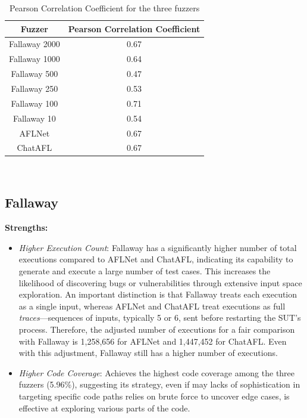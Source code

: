 \begin{table}[H]
    \centering
    \begin{tabular}{|c|c|}
    \hline
    \textbf{Fuzzer} & \textbf{Pearson Correlation Coefficient} \\
    \hline
    Fallaway 2000 & 0.67 \\
    \hline
    Fallaway 1000 & 0.64 \\
    \hline
    Fallaway 500 & 0.47 \\
    \hline
    Fallaway 250 & 0.53 \\
    \hline
    Fallaway 100 & 0.71 \\
    \hline
    Fallaway 10 & 0.54 \\
    \hline
    AFLNet & 0.67 \\
    \hline
    ChatAFL & 0.67 \\
    \hline
    \end{tabular}
    \caption{Pearson Correlation Coefficient for the three fuzzers}
    \label{tab:pearson_correlation}
\end{table}

\phantom{}\\

\subsection{Fallaway}
\label{sec:fallaway_analysis}

\textbf{Strengths:}
\begin{itemize}
    \item \textit{Higher Execution Count}: Fallaway has a significantly higher number of total executions compared to AFLNet and ChatAFL, indicating its capability to generate and execute a large number of test cases. This increases the likelihood of discovering bugs or vulnerabilities through extensive input space exploration. An important distinction is that Fallaway treats each execution as a single input, whereas AFLNet and ChatAFL treat executions as full \textit{traces}—sequences of inputs, typically 5 or 6, sent before restarting the SUT's process. Therefore, the adjusted number of executions for a fair comparison with Fallaway is 1,258,656 for AFLNet and 1,447,452 for ChatAFL. Even with this adjustment, Fallaway still has a higher number of executions.
    \item \textit{Higher Code Coverage}: Achieves the highest code coverage among the three fuzzers (5.96\%), suggesting its strategy, even if may lacks of  sophistication in targeting specific code paths relies on brute force to uncover edge cases, is effective at exploring various parts of the code.
\end{itemize}

